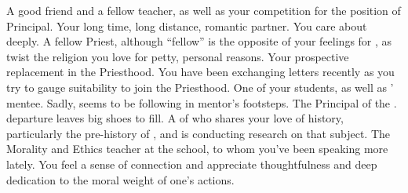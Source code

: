 \documentclass[char]{GL2020}
\begin{document}
\begin{contacts}
	\contact{\cMusic{}} A good friend and a fellow teacher, as well as your competition for the position of Principal.
	\contact{\cJuniorStatesman{}} Your long time, long distance, romantic partner. You care about \cJuniorStatesman{\them} deeply.
	\contact{\cAntiChup{}} A fellow Priest, although ``fellow'' is the opposite of your feelings for \cAntiChup{\them}, as \cAntiChup{\they} twist\cAntiChup{\plural} the religion you love for petty, personal reasons.
	\contact{\cHeadScientist{}} Your prospective replacement in the Priesthood. You have been exchanging letters recently as you try to gauge \cHeadScientist{\their} suitability to join the Priesthood.
	\contact{\cScholarship{}} One of your students, as well as \cAntiChup{}' mentee. Sadly, \cScholarship{\they} seems to be following in \cScholarship{\their} mentor's footsteps.
	\contact{\cPrincipal{}} The Principal of the \pSchool{}. \cPrincipal{\Their} departure leaves big shoes to fill.
	\contact{\cEbbPriest{}} A \cEbbPriest{\cleric} of \cEbb{} who shares your love of history, particularly the pre-history of \pEarth{}, and is conducting research on that subject. 
	\contact{\cEthics{}} The Morality and Ethics teacher at the school, to whom you've been speaking more lately. You feel a sense of connection and appreciate \cEthics{\their} thoughtfulness and deep dedication to the moral weight of one's actions. 
\end{contacts}
\end{document}
